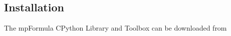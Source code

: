%
%
%
%
%
%
%
%


\subsection{Installation}
\label{Installation}
The mpFormula CPython Library and Toolbox can be downloaded from 

